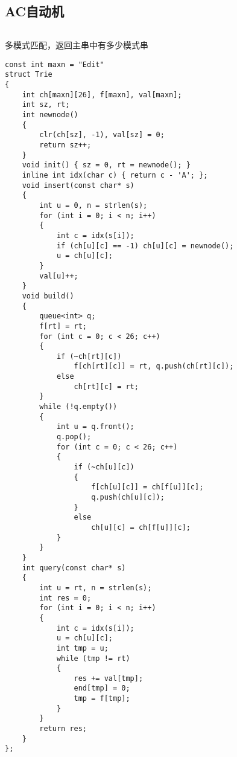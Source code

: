 \documentclass[a4]{article}
\begin{document}
\subsection{AC自动机}
\begin{lstlisting}
\end{lstlisting}
多模式匹配，返回主串中有多少模式串
\begin{lstlisting}
const int maxn = "Edit"
struct Trie
{
    int ch[maxn][26], f[maxn], val[maxn];
    int sz, rt;
    int newnode()
    {
        clr(ch[sz], -1), val[sz] = 0;
        return sz++;
    }
    void init() { sz = 0, rt = newnode(); }
    inline int idx(char c) { return c - 'A'; };
    void insert(const char* s)
    {
        int u = 0, n = strlen(s);
        for (int i = 0; i < n; i++)
        {
            int c = idx(s[i]);
            if (ch[u][c] == -1) ch[u][c] = newnode();
            u = ch[u][c];
        }
        val[u]++;
    }
    void build()
    {
        queue<int> q;
        f[rt] = rt;
        for (int c = 0; c < 26; c++)
        {
            if (~ch[rt][c])
                f[ch[rt][c]] = rt, q.push(ch[rt][c]);
            else
                ch[rt][c] = rt;
        }
        while (!q.empty())
        {
            int u = q.front();
            q.pop();
            for (int c = 0; c < 26; c++)
            {
                if (~ch[u][c])
                {
                    f[ch[u][c]] = ch[f[u]][c];
                    q.push(ch[u][c]);
                }
                else
                    ch[u][c] = ch[f[u]][c];
            }
        }
    }
    int query(const char* s)
    {
        int u = rt, n = strlen(s);
        int res = 0;
        for (int i = 0; i < n; i++)
        {
            int c = idx(s[i]);
            u = ch[u][c];
            int tmp = u;
            while (tmp != rt)
            {
                res += val[tmp];
                end[tmp] = 0;
                tmp = f[tmp];
            }
        }
        return res;
    }
};
\end{lstlisting}
\end{document}
